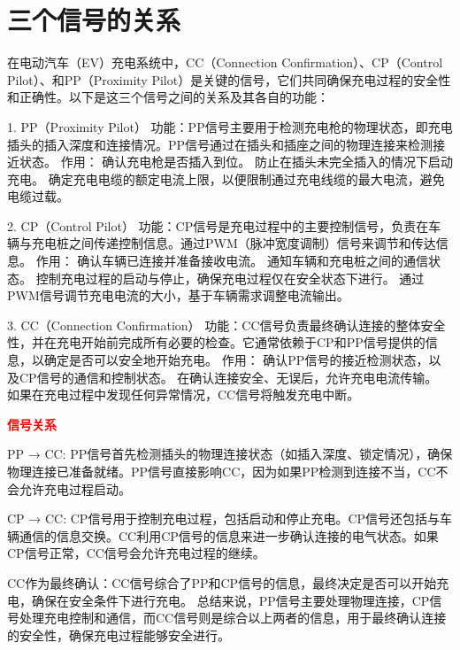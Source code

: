 \section{三个信号的关系}

在电动汽车（EV）充电系统中，CC（Connection Confirmation）、CP（Control Pilot）、和PP（Proximity Pilot）是关键的信号，它们共同确保充电过程的安全性和正确性。以下是这三个信号之间的关系及其各自的功能：

1. PP（Proximity Pilot）
功能：PP信号主要用于检测充电枪的物理状态，即充电插头的插入深度和连接情况。PP信号通过在插头和插座之间的物理连接来检测接近状态。
作用：
确认充电枪是否插入到位。
防止在插头未完全插入的情况下启动充电。
确定充电电缆的额定电流上限，以便限制通过充电线缆的最大电流，避免电缆过载。

2. CP（Control Pilot）
功能：CP信号是充电过程中的主要控制信号，负责在车辆与充电桩之间传递控制信息。通过PWM（脉冲宽度调制）信号来调节和传达信息。
作用：
确认车辆已连接并准备接收电流。
通知车辆和充电桩之间的通信状态。
控制充电过程的启动与停止，确保充电过程仅在安全状态下进行。
通过PWM信号调节充电电流的大小，基于车辆需求调整电流输出。

3. CC（Connection Confirmation）
功能：CC信号负责最终确认连接的整体安全性，并在充电开始前完成所有必要的检查。它通常依赖于CP和PP信号提供的信息，以确定是否可以安全地开始充电。
作用：
确认PP信号的接近检测状态，以及CP信号的通信和控制状态。
在确认连接安全、无误后，允许充电电流传输。
如果在充电过程中发现任何异常情况，CC信号将触发充电中断。

\noindent\textcolor{red}{\bf 信号关系}

PP → CC: PP信号首先检测插头的物理连接状态（如插入深度、锁定情况），确保物理连接已准备就绪。PP信号直接影响CC，因为如果PP检测到连接不当，CC不会允许充电过程启动。

CP → CC: CP信号用于控制充电过程，包括启动和停止充电。CP信号还包括与车辆通信的信息交换。CC利用CP信号的信息来进一步确认连接的电气状态。如果CP信号正常，CC信号会允许充电过程的继续。

CC作为最终确认：CC信号综合了PP和CP信号的信息，最终决定是否可以开始充电，确保在安全条件下进行充电。
总结来说，PP信号主要处理物理连接，CP信号处理充电控制和通信，而CC信号则是综合以上两者的信息，用于最终确认连接的安全性，确保充电过程能够安全进行。


